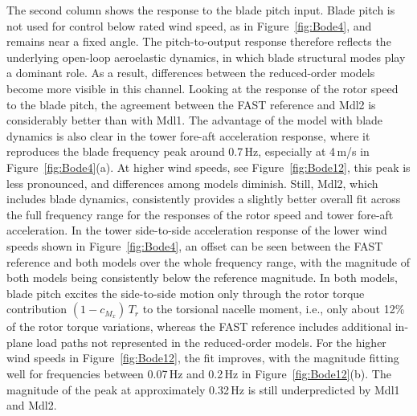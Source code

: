     The second column shows the response to the blade pitch input. Blade pitch is not used for control below rated wind speed, as in Figure~\ref{fig:Bode4}, and remains near a fixed angle. The pitch-to-output response therefore reflects the underlying open-loop aeroelastic dynamics, in which blade structural modes play a dominant role. As a result, differences between the reduced-order models become more visible in this channel. Looking at the response of the rotor speed to the blade pitch, the agreement between the FAST reference and Mdl2 is considerably better than with Mdl1. The advantage of the model with blade dynamics is also clear in the tower fore-aft acceleration response, where it reproduces the blade frequency peak around 0.7\,Hz, especially at 4\,m/s in Figure~\ref{fig:Bode4}(a). At higher wind speeds, see Figure~\ref{fig:Bode12}, this peak is less pronounced, and differences among models diminish. Still, Mdl2, which includes blade dynamics, consistently provides a slightly better overall fit across the full frequency range for the responses of the rotor speed and tower fore-aft acceleration. In the tower side-to-side acceleration response of the lower wind speeds shown in Figure~\ref{fig:Bode4}, an offset can be seen between the FAST reference and both models over the whole frequency range, with the magnitude of both models being consistently below the reference magnitude. In both models, blade pitch excites the side-to-side motion only through the rotor torque contribution $(1-c_{M_x})\,T_r$ to the torsional nacelle moment, i.e., only about 12\% of the rotor torque variations, whereas the FAST reference includes additional in-plane load paths not represented in the reduced-order models. For the higher wind speeds in Figure~\ref{fig:Bode12}, the fit improves, with the magnitude fitting well for frequencies between 0.07\,Hz and 0.2\,Hz in Figure~\ref{fig:Bode12}(b). The magnitude of the peak at approximately 0.32\,Hz is still underpredicted by Mdl1 and Mdl2.
    
